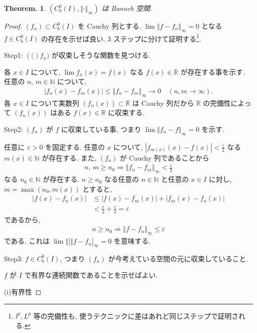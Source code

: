 \documentclass[openany, a4paper, oneside]{jsbook}
\theoremstyle{break}
\newtheorem{thm}{Theorem.}[section]
\theoremstyle{breakdefn}
\newcommand{\abs}[1]{\left|#1\right|}
\newcommand{\norm}[1]{\left\Vert#1\right\Vert}
\newcommand{\rbk}[1]{\left (#1\right)}
\newcommand{\bbN}{\mathbb{N}}
\newcommand{\bbR}{\mathbb{R}}
\begin{document}
\begin{thm}
 $(C^0_b(I), \norm{\cdot}_{\infty})$ は Banach 空間.
\end{thm}
\begin{proof}
$\rbk{f_n} \subset C^0_b(I)$ を Cauchy 列とする.
$\lim \norm{f - f_n}_{\infty} = 0$ となる $f \in C^0_b(I)$ の存在を示せば良い.
3 ステップに分けて証明する\footnote{ $l^p, L^p$ 等の完備性も, 使うテクニックに差はあれど同じステップで証明される.}.

\textsf{Step1}: $\rbk(f_n)$ が収束しそうな関数を見つける.

各 $x \in I$ について, $\lim f_n(x)=f(x)$ なる $f(x) \in \bbR$ が存在する事を示す.
任意の $n$, $m \in \bbN$ について,
\begin{align*}
 \abs{f_n(x) - f_m(x)}
 \leq
 \norm{f_n - f_m}_{\infty} \to 0 \quad (n, m \to \infty).
\end{align*}
各 $x \in I$ について実数列 $\rbk{f_n(x)} \subset \bbR$ は Cauchy 列だから
$\bbR$ の完備性によって $\rbk{f_n(x)}$ はある $f(x) \in \bbR$ に収束する.

\textsf{Step2}: $\rbk{f_n}$ が $f$ に収束している事, つまり $\lim \norm{f_n - f}_{\infty} = 0$ を示す.

任意に $\varepsilon > 0$ を固定する.
任意の $x$ について, $\abs{f_{m(x)}(x)- f (x)} < \frac{\varepsilon}{2}$ なる $m(x) \in \bbN$ が存在する.
また, $\rbk{f_n}$ が Cauchy 列であることから
\begin{align*}
 n, \,  m
 \geq
 n_0
 \Rightarrow
 \norm{f_n - f_m}_{\infty}
 <
 \frac{\varepsilon}{2}
\end{align*}
なる $n_0 \in \bbN$ が存在する.
$n \geq n_0$ なる任意の $n \in \bbN$ と任意の $x \in I$ に対し,
$m = \max \rbk{n_0, m(x)}$ とすると,
\begin{align*}
 \abs{f(x) - f_n(x)}
 &\leq
 \abs{f(x) - f_m(x)} + \abs{f_m(x) - f_n(x)} \\
 &<
 \frac{\varepsilon}{2} + \frac{\varepsilon}{2}
 =
 \varepsilon
\end{align*}
であるから,
\begin{align*}
 n
 \geq
 n_0
 \Rightarrow
 \norm{f - f_n}_{\infty}
 \leq
 \varepsilon
\end{align*}
である.
これは $\lim \norm[f - f_n]_{\infty} = 0$ を意味する.

\textsf{Step3}: $f \in C^0_b(I)$, つまり $\rbk{f_n}$ が今考えている空間の元に収束していること.

$f$ が $I$ で有界な連続関数であることを示せばよい.

(i)有界性


\end{proof}
\end{document}
